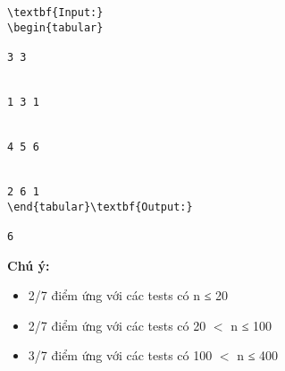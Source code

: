 \begin{verbatim}
\textbf{Input:}
\begin{tabular}

3 3  


1 3 1  


4 5 6  


2 6 1
\end{tabular}\textbf{Output:}

6\end{verbatim}

\textbf{ Chú ý: }
\begin{itemize}
	\item 2/7 điểm ứng với các tests có n ≤ 20 
	\item 2/7 điểm ứng với các tests có 20 $<$ n ≤ 100
	\item 3/7 điểm ứng với các tests có 100 $<$ n ≤ 400
\end{itemize}